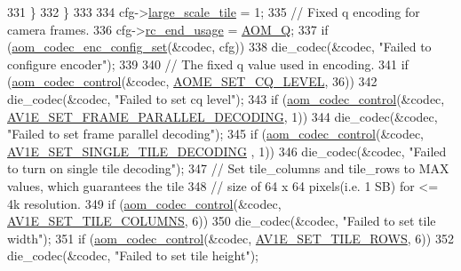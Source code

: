 \begin{DoxyCodeInclude}
{{{{{{{331     \}
332   \}
333 
334   cfg->\hyperlink{structaom__codec__enc__cfg_af4583da6c145778f822a4a61db28c40a}{large\_scale\_tile} = 1;
335   \textcolor{comment}{// Fixed q encoding for camera frames.}
336   cfg->\hyperlink{structaom__codec__enc__cfg_a3fd74d888658039d09bc4eacf163a495}{rc\_end\_usage} = \hyperlink{group__encoder_gga7c084d3ecef569aad166ce70b0e8a957aff3bbd4fe870b4b946c2093e59eb14e5}{AOM\_Q};
337   \textcolor{keywordflow}{if} (\hyperlink{group__encoder_gaf4a4c3c3c91dd92c960990f6e534271d}{aom\_codec\_enc\_config\_set}(&codec, cfg))
338     die\_codec(&codec, \textcolor{stringliteral}{"Failed to configure encoder"});
339 
340   \textcolor{comment}{// The fixed q value used in encoding.}
341   \textcolor{keywordflow}{if} (\hyperlink{group__codec_ga6da974f4eeaba1fa74106b28d0fe6ac5}{aom\_codec\_control}(&codec, \hyperlink{group__aom__encoder_ggae78dde67a6d78f332e9bdba0dde42db5af67f265bf63bf8f1268b3a14ae26606c}{AOME\_SET\_CQ\_LEVEL}, 36))
342     die\_codec(&codec, \textcolor{stringliteral}{"Failed to set cq level"});
343   \textcolor{keywordflow}{if} (\hyperlink{group__codec_ga6da974f4eeaba1fa74106b28d0fe6ac5}{aom\_codec\_control}(&codec, 
      \hyperlink{group__aom__encoder_ggae78dde67a6d78f332e9bdba0dde42db5a465382b6bbca24467739c3c1b94e6483}{AV1E\_SET\_FRAME\_PARALLEL\_DECODING}, 1))
344     die\_codec(&codec, \textcolor{stringliteral}{"Failed to set frame parallel decoding"});
345   \textcolor{keywordflow}{if} (\hyperlink{group__codec_ga6da974f4eeaba1fa74106b28d0fe6ac5}{aom\_codec\_control}(&codec, \hyperlink{group__aom__encoder_ggae78dde67a6d78f332e9bdba0dde42db5af341538631ffe2ac2b562c8b5336a10a}{AV1E\_SET\_SINGLE\_TILE\_DECODING}
      , 1))
346     die\_codec(&codec, \textcolor{stringliteral}{"Failed to turn on single tile decoding"});
347   \textcolor{comment}{// Set tile\_columns and tile\_rows to MAX values, which guarantees the tile}
348   \textcolor{comment}{// size of 64 x 64 pixels(i.e. 1 SB) for <= 4k resolution.}
349   \textcolor{keywordflow}{if} (\hyperlink{group__codec_ga6da974f4eeaba1fa74106b28d0fe6ac5}{aom\_codec\_control}(&codec, \hyperlink{group__aom__encoder_ggae78dde67a6d78f332e9bdba0dde42db5acf4ab1ff2fa8d76a78881ad7f1a1294d}{AV1E\_SET\_TILE\_COLUMNS}, 6))
350     die\_codec(&codec, \textcolor{stringliteral}{"Failed to set tile width"});
351   \textcolor{keywordflow}{if} (\hyperlink{group__codec_ga6da974f4eeaba1fa74106b28d0fe6ac5}{aom\_codec\_control}(&codec, \hyperlink{group__aom__encoder_ggae78dde67a6d78f332e9bdba0dde42db5a57f2f2a54f593b398a5e97db7982f817}{AV1E\_SET\_TILE\_ROWS}, 6))
352     die\_codec(&codec, \textcolor{stringliteral}{"Failed to set tile height"});
}}}}}}}
\end{DoxyCodeInclude}
